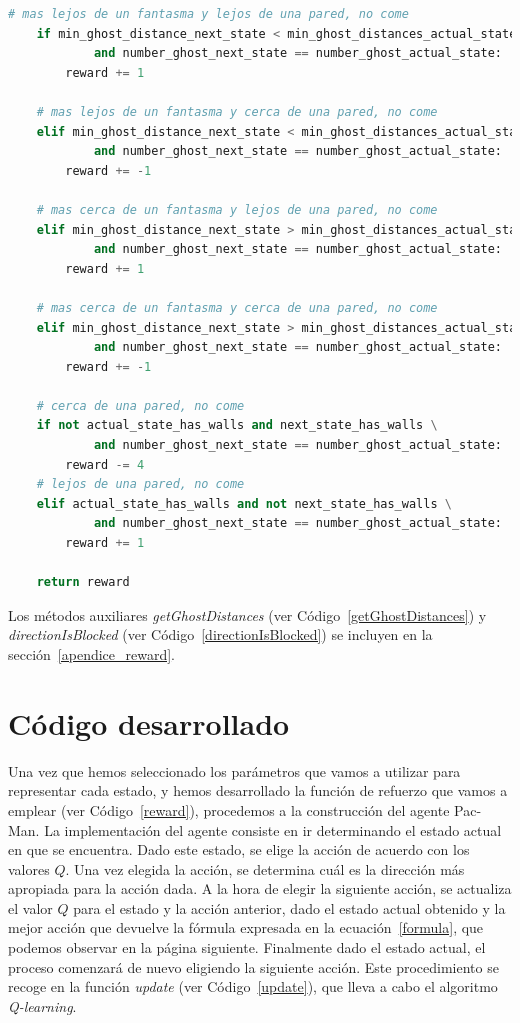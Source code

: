 \documentclass[11pt]{exam}
\begin{document}
\begin{lstlisting}[caption={Función de refuerzo.}, label={reward}, language=python, basicstyle=\footnotesize]
	# mas lejos de un fantasma y lejos de una pared, no come
	if min_ghost_distance_next_state < min_ghost_distances_actual_state and not actual_state_has_walls \
			and number_ghost_next_state == number_ghost_actual_state:
		reward += 1
	
	# mas lejos de un fantasma y cerca de una pared, no come
	elif min_ghost_distance_next_state < min_ghost_distances_actual_state and actual_state_has_walls \
			and number_ghost_next_state == number_ghost_actual_state:
		reward += -1
	
	# mas cerca de un fantasma y lejos de una pared, no come
	elif min_ghost_distance_next_state > min_ghost_distances_actual_state and not actual_state_has_walls \
			and number_ghost_next_state == number_ghost_actual_state:
		reward += 1
	
	# mas cerca de un fantasma y cerca de una pared, no come
	elif min_ghost_distance_next_state > min_ghost_distances_actual_state and actual_state_has_walls \
			and number_ghost_next_state == number_ghost_actual_state:
		reward += -1
	
	# cerca de una pared, no come
	if not actual_state_has_walls and next_state_has_walls \
			and number_ghost_next_state == number_ghost_actual_state:
		reward -= 4
	# lejos de una pared, no come
	elif actual_state_has_walls and not next_state_has_walls \
			and number_ghost_next_state == number_ghost_actual_state:
		reward += 1
	
	return reward	
\end{lstlisting}

Los métodos auxiliares \textit{getGhostDistances} (ver Código~\ref{getGhostDistances}) y \textit{directionIsBlocked} (ver Código~\ref{directionIsBlocked}) se incluyen en la sección~\ref*{apendice_reward}.

\section{Código desarrollado}\label{codigo}

Una vez que hemos seleccionado los parámetros que vamos a utilizar para representar cada estado, y hemos desarrollado la función de refuerzo que vamos a emplear (ver Código~\ref{reward}), procedemos a la construcción del agente Pac-Man. La implementación del agente consiste en ir determinando el estado actual en que se encuentra. Dado este estado, se elige la acción de acuerdo con los valores $Q$. Una vez elegida la acción, se determina cuál es la dirección más apropiada para la acción dada. A la hora de elegir la siguiente acción, se actualiza el valor $Q$ para el estado y la acción anterior, dado el estado actual obtenido y la mejor acción que devuelve la fórmula expresada en la ecuación~\ref{formula}, que podemos observar en la página siguiente. Finalmente dado el estado actual, el proceso comenzará de nuevo eligiendo la siguiente acción. Este procedimiento se recoge en la función \textit{update} (ver Código~\ref{update}), que lleva a cabo el algoritmo \textit{Q-learning}. 
\end{document}
